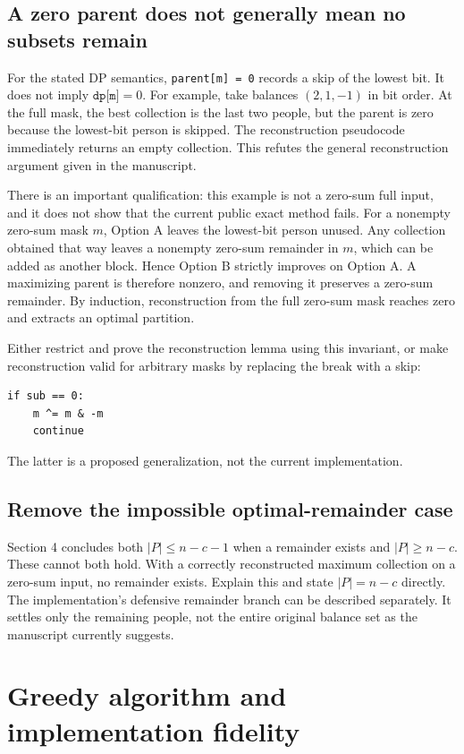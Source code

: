 \documentclass[11pt]{article}
\begin{document}
\subsection{A zero parent does not generally mean no subsets remain}

For the stated DP semantics, \texttt{parent[m] = 0} records a skip of
the lowest bit. It does not imply $\texttt{dp[m]}=0$. For example, take
balances $(2,1,-1)$ in bit order. At the full mask, the best collection
is the last two people, but the parent is zero because the lowest-bit
person is skipped. The reconstruction pseudocode immediately returns
an empty collection. This refutes the general reconstruction argument
given in the manuscript.

There is an important qualification: this example is not a zero-sum full
input, and it does not show that the current public exact method fails.
For a nonempty zero-sum mask $m$, Option A leaves the lowest-bit person
unused. Any collection obtained that way leaves a nonempty zero-sum
remainder in $m$, which can be added as another block. Hence Option B
strictly improves on Option A. A maximizing parent is therefore nonzero,
and removing it preserves a zero-sum remainder. By induction, reconstruction
from the full zero-sum mask reaches zero and extracts an optimal partition.

Either restrict and prove the reconstruction lemma using this invariant,
or make reconstruction valid for arbitrary masks by replacing the break
with a skip:
\begin{verbatim}
if sub == 0:
    m ^= m & -m
    continue
\end{verbatim}
The latter is a proposed generalization, not the current implementation.

\subsection{Remove the impossible optimal-remainder case}

Section 4 concludes both $|P|\leq n-c-1$ when a remainder exists and
$|P|\geq n-c$. These cannot both hold. With a correctly reconstructed
maximum collection on a zero-sum input, no remainder exists. Explain this
and state $|P|=n-c$ directly. The implementation's defensive remainder
branch can be described separately. It settles only the remaining people,
not the entire original balance set as the manuscript currently suggests.

\section{Greedy algorithm and implementation fidelity}
\end{document}
